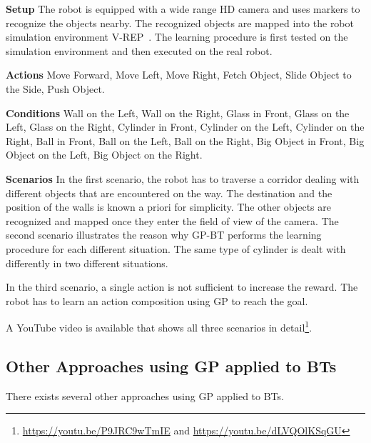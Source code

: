 \textbf{Setup}
The robot is equipped with a wide range HD camera and uses markers to recognize the objects nearby. The recognized objects are mapped into the robot simulation environment V-REP~\cite{freese2010virtual}. The learning procedure is first tested on the simulation environment and then executed on the real robot.

\textbf{Actions}
Move Forward, Move Left, Move Right, Fetch Object, Slide Object to the Side, Push Object. 

\textbf{Conditions}
Wall on the Left, Wall on the Right, Glass in Front, Glass on the Left, Glass on the Right, Cylinder in Front, Cylinder on the Left, Cylinder on the Right, Ball in Front, Ball on the Left, Ball on the Right, Big Object in Front, Big Object on the Left, Big Object on the Right.



\textbf{Scenarios}
 In the first scenario, the robot has to traverse a corridor dealing with different objects that are encountered on the way.
The destination and the position of the walls is known a priori for simplicity. The other objects are recognized and mapped once they enter the field of view of the camera. 
The second scenario illustrates the reason why GP-BT performs the learning procedure for each different situation. 
The same type of cylinder is dealt with differently in two different situations.

In the third scenario, a single action is not sufficient to increase the reward. The robot has to learn an
action composition using GP to reach the goal.

A YouTube video is available that shows all three scenarios in detail\footnote{\url{https://youtu.be/P9JRC9wTmIE} and \url{https://youtu.be/dLVQOlKSqGU}}.



\subsection{Other Approaches using GP applied to BTs}
There exists several other approaches using GP applied to BTs. 


